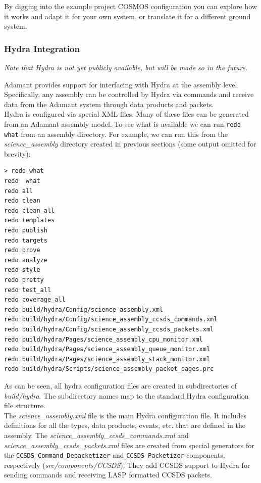 By digging into the example project COSMOS configuration you can explore how it works and adapt it for your own system, or translate it for a different ground system.

\subsubsection{Hydra Integration}

\textit{Note that Hydra is not yet publicly available, but will be made so in the future.}

Adamant provides support for interfacing with Hydra at the assembly level. Specifically, any assembly can be controlled by Hydra via commands and receive data from the Adamant system through data products and packets. \\

Hydra is configured via special XML files. Many of these files can be generated from an Adamant assembly model. To see what is available we can run \texttt{redo what} from an assembly directory. For example, we can run this from the \textit{science\_assembly} directory created in previous sections (some output omitted for brevity):

\vspace{5mm} %
\begin{verbatim}
> redo what
redo  what
redo all
redo clean
redo clean_all
redo templates
redo publish
redo targets
redo prove
redo analyze
redo style
redo pretty
redo test_all
redo coverage_all
redo build/hydra/Config/science_assembly.xml
redo build/hydra/Config/science_assembly_ccsds_commands.xml
redo build/hydra/Config/science_assembly_ccsds_packets.xml
redo build/hydra/Pages/science_assembly_cpu_monitor.xml
redo build/hydra/Pages/science_assembly_queue_monitor.xml
redo build/hydra/Pages/science_assembly_stack_monitor.xml
redo build/hydra/Scripts/science_assembly_packet_pages.prc
\end{verbatim}
\vspace{5mm} %

As can be seen, all hydra configuration files are created in subdirectories of \textit{build/hydra}. The subdirectory names map to the standard Hydra configuration file structure. \\

The \textit{science\_assembly.xml} file is the main Hydra configuration file. It includes definitions for all the types, data products, events, etc. that are defined in the assembly. The \textit{science\_assembly\_ccsds\_commands.xml} and \textit{science\_assembly\_ccsds\_packets.xml} files are created from special generators for the \texttt{CCSDS\_Command\_Depacketizer} and \texttt{CCSDS\_Packetizer} components, respectively (\textit{src/components/CCSDS}). They add CCSDS support to Hydra for sending commands and receiving LASP formatted CCSDS packets. \\

